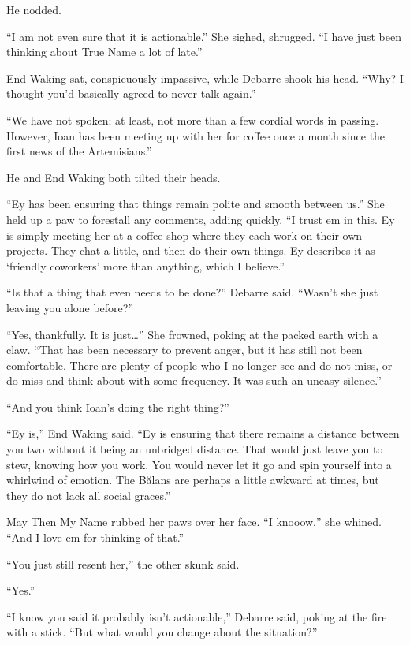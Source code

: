 He nodded.

``I am not even sure that it is actionable.'' She sighed, shrugged. ``I have just been thinking about True Name a lot of late.''

End Waking sat, conspicuously impassive, while Debarre shook his head. ``Why? I thought you'd basically agreed to never talk again.''

``We have not spoken; at least, not more than a few cordial words in passing. However, Ioan has been meeting up with her for coffee once a month since the first news of the Artemisians.''

He and End Waking both tilted their heads.

``Ey has been ensuring that things remain polite and smooth between us.'' She held up a paw to forestall any comments, adding quickly, ``I trust em in this. Ey is simply meeting her at a coffee shop where they each work on their own projects. They chat a little, and then do their own things. Ey describes it as `friendly coworkers' more than anything, which I believe.''

``Is that a thing that even needs to be done?'' Debarre said. ``Wasn't she just leaving you alone before?''

``Yes, thankfully. It is just\ldots{}'' She frowned, poking at the packed earth with a claw. ``That has been necessary to prevent anger, but it has still not been comfortable. There are plenty of people who I no longer see and do not miss, or do miss and think about with some frequency. It was such an uneasy silence.''

``And you think Ioan's doing the right thing?''

``Ey is,'' End Waking said. ``Ey is ensuring that there remains a distance between you two without it being an unbridged distance. That would just leave you to stew, knowing how you work. You would never let it go and spin yourself into a whirlwind of emotion. The Bălans are perhaps a little awkward at times, but they do not lack all social graces.''

May Then My Name rubbed her paws over her face. ``I knooow,'' she whined. ``And I love em for thinking of that.''

``You just still resent her,'' the other skunk said.

``Yes.''

``I know you said it probably isn't actionable,'' Debarre said, poking at the fire with a stick. ``But what would you change about the situation?''

